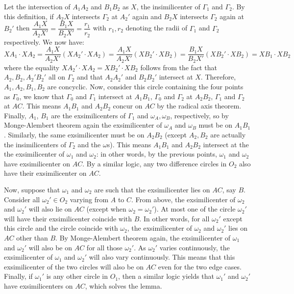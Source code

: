 \documentclass[11pt]{article}
\newcommand{\<}{\langle}
\renewcommand{\>}{\rangle}
\begin{document}
\begin{enumerate}
	Let the intersection of $A_1A_2$ and $B_1B_2$ as $X$, the insimilicenter of $\Gamma_1$ and $\Gamma_2$. By this definition, if $A_2X$ intersects $\Gamma_2$ at $A_2'$ again and $B_2X$ intersects $\Gamma_2$ again at $B_2'$ then $\dfrac{A_1X}{A_2X'}=\dfrac{B_1X}{B_2X'}=\dfrac{r_1}{r_2}$ with $r_1, r_2$ denoting the radii of $\Gamma_1$ and $\Gamma_2$ respectively. We now have: 
	\[
	XA_1\cdot XA_2 = \dfrac{A_1X}{A_2X'} (XA_2' \cdot XA_2) = \dfrac{A_1X}{A_2X'} (XB_2' \cdot XB_2)
	= \dfrac{B_1X}{B_2X'} (XB_2' \cdot XB_2) = XB_1\cdot XB_2
	\]
	where the equality $XA_2' \cdot XA_2 = XB_2' \cdot XB_2$ follows from the fact that $A_2, B_2, A_2' B_2'$ all on $\Gamma_2$ and that $A_2A_2'$ and $B_2B_2'$ intersect at $X$. 
	Therefore, $A_1, A_2, B_1, B_2$ are concyclic. Now, consider this circle containing the four points as $\Gamma_0$, we know that $\Gamma_0$ and $\Gamma_1$ intersect at $A_1B_1$, $\Gamma_0$ and $\Gamma_2$ at $A_2B_2$, $\Gamma_1$ and $\Gamma_2$ at $AC$. This means $A_1B_1$ and $A_2B_2$ concur on $AC$ by the radical axis theorem. 
	Finally, $A_1$, $B_1$ are the exsimilicenters of $\Gamma_1$ and $\omega_A, \omega_B$, respectively, so by Monge-Alembert theorem again the exsimilicenter of $\omega_A$ and $\omega_B$ must be on $A_1B_1$. Similarly, the same exsimilicenter must be on $A_2B_2$ (except $A_2, B_2$ are actually the insimilicenters of $\Gamma_2$ and the $\omega$s). This means $A_1B_1$ and $A_2B_2$ intersect at the the exsimilicenter of $\omega_1$ and $\omega_2$: in other words, by the previous points, $\omega_1$ and $\omega_2$ have exsimilicenter on $AC$. 
	By a similar logic, any two difference circles in $O_2$ also have their exsimilicenter on $AC$. 
	
	Now, suppose that $\omega_1$ and $\omega_2$ are such that the exsimilicenter lies on $AC$, say $B$. 
	Consider all $\omega_2'\in O_2$ varying from $A$ to $C$. From above, the exsimilicenter of $\omega_2$ and $\omega_2'$ will also lie on $AC$ (except when $\omega_2=\omega_2'$). At most one of the circle $\omega_2'$ will have their exsimilicenter coincide with $B$. In other words, for all $\omega_2'$ except this circle and the circle coincide with $\omega_2$, the exsimilicenter of $\omega_2$ and $\omega_2'$ lies on $AC$ other than $B$. By Monge-Alembert theorem again, the exsimilicenter of $\omega_1$ and $\omega_2'$ will also be on $AC$ for all those $\omega_2'$. As $\omega_2'$ varies continuously, the exsimilicenter of $\omega_1$ and $\omega_2'$ will also vary continuously. This means that this exsimilicenter of the two circles will also be on $AC$ even for the two edge cases. 
	Finally, if $\omega_1'$ is any other circle in $O_1$, then a similar logic yields that $\omega_1'$ and $\omega_2'$ have exsimilicenters on $AC$, which solves the lemma. 
	

\end{enumerate}
\end{document}
